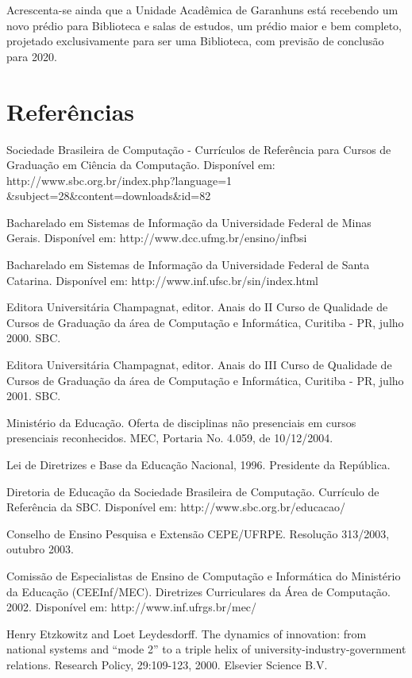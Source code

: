 \documentclass[
	12pt,				%
	openright,			%
  oneside,     %
	a4paper,			%
	chapter=TITLE,		%
	english,			%
	french,				%
	spanish,			%
	brazil				%
	]{abntex2}
\begin{document}
Acrescenta-se ainda que a Unidade Acadêmica de Garanhuns está recebendo um novo prédio para Biblioteca e salas de estudos, um prédio maior e bem completo, projetado exclusivamente para ser uma Biblioteca, com previsão de conclusão para 2020.


\chapter*[Referências]{Referências}

\noindent Sociedade Brasileira de Computação - Currículos de Referência para Cursos de Graduação em Ciência da Computação. Disponível em: http://www.sbc.org.br/index.php?language=1 \&subject=28\&content=downloads\&id=82

\noindent Bacharelado em Sistemas de Informação da Universidade Federal de Minas Gerais. Disponível em: http://www.dcc.ufmg.br/ensino/infbsi 

\noindent Bacharelado em Sistemas de Informação da Universidade Federal de Santa Catarina. Disponível em: http://www.inf.ufsc.br/sin/index.html


\noindent Editora Universitária Champagnat, editor. Anais do II Curso de Qualidade de Cursos de Graduação da área de Computação e Informática, Curitiba - PR, julho 2000. SBC.

\noindent Editora Universitária Champagnat, editor. Anais do III Curso de Qualidade de Cursos de Graduação da área de Computação e Informática, Curitiba - PR, julho 2001. SBC.

\noindent Ministério da Educação.  Oferta de disciplinas não presenciais em cursos presenciais reconhecidos.  MEC, Portaria No. 4.059, de 10/12/2004.

 
\noindent Lei de Diretrizes e Base da Educação Nacional, 1996. Presidente da República.

\noindent Diretoria de Educação da Sociedade Brasileira de Computação. Currículo de Referência da SBC. Disponível em: http://www.sbc.org.br/educacao/

\noindent Conselho de Ensino Pesquisa e Extensão CEPE/UFRPE. Resolução 313/2003, outubro 2003.

\noindent Comissão de Especialistas de Ensino de Computação e Informática do Ministério da Educação (CEEInf/MEC). Diretrizes Curriculares da Área de Computação. 2002.  Disponível em: http://www.inf.ufrgs.br/mec/

\noindent Henry Etzkowitz and Loet Leydesdorff. The dynamics of innovation: from national systems and ``mode 2'' to a triple helix of university-industry-government relations. Research Policy, 29:109-123, 2000. Elsevier Science B.V.
\end{document}
